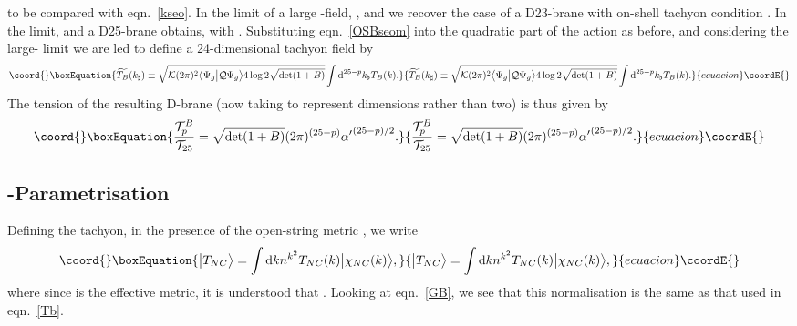 \documentclass[letterpaper,12pt]{article}
\def\Pcm#1{{\mathcal{#1}}}
\def\er#1{eqn.~\eqref{#1}}
\providecommand{\td}{\textup{d}}
\begin{document}
to be compared with \er{kseo}. In the limit of a large \coordHE{}-field, \coordHE{}, and we
recover the case of a D23-brane with on-shell tachyon condition \coordHE{}. In the
\coordHE{} limit, \coordHE{} and a D25-brane obtains, 
with \coordHE{}.
Substituting \er{OSBseom} into the quadratic part of the action as before, 
and considering the large-\coordHE{} limit we are led to
define a 24-dimensional tachyon field by
\begin{equation}\coord{}\boxEquation{
\label{newtachB}
  \widetilde{T_B}(\kn) \equiv 
  \sqrt{\Pcm{K} (2\pi)^2 \big\langle\Psi_g\big|\Pcm{Q}\Psi_g\big\rangle 4\log2 \sqrt{\det (1+B)}  } 
  \int \td^{25-p}\kb T_B(k)
.}{
\widetilde{T_B}(\kn) \equiv 
  \sqrt{\Pcm{K} (2\pi)^2 \big\langle\Psi_g\big|\Pcm{Q}\Psi_g\big\rangle 4\log2 \sqrt{\det (1+B)}  } 
  \int \td^{25-p}\kb T_B(k)
.}{ecuacion}\coordE{}\end{equation}
The tension of the resulting D\coordHE{}-brane (now taking \myHighlight{$\kb$}\coordHE{} to represent \coordHE{} dimensions rather than two) 
is thus given by
\begin{equation}\coord{}\boxEquation{
\label{Btension}
\frac{\Pcm{T}^B_p}{\Pcm{T}_{25}}
 = { \sqrt{\det(1+B)} }{(2\pi)^{(25-p)}{\alpha'}^{(25-p)/2} } 
.}{
\frac{\Pcm{T}^B_p}{\Pcm{T}_{25}}
 = { \sqrt{\det(1+B)} }{(2\pi)^{(25-p)}{\alpha'}^{(25-p)/2} } 
.}{ecuacion}\coordE{}\end{equation}


\subsection{\coordHE{}-Parametrisation}

Defining the tachyon, in the presence of the open-string metric \coordHE{}, we write
\begin{equation}\coord{}\boxEquation{
 \big|T_{NC}\big\rangle = \int \td k n^{k^2 } T_{NC}(k) \big|\chi_{NC}(k)\big\rangle 
,}{
 \big|T_{NC}\big\rangle = \int \td k n^{k^2 } T_{NC}(k) \big|\chi_{NC}(k)\big\rangle 
,}{ecuacion}\coordE{}\end{equation}
where since \coordHE{} is the effective metric, it is understood that \coordHE{}.
Looking at \er{GB}, we see that this normalisation is the same as that used in \er{Tb}.
\end{document}
